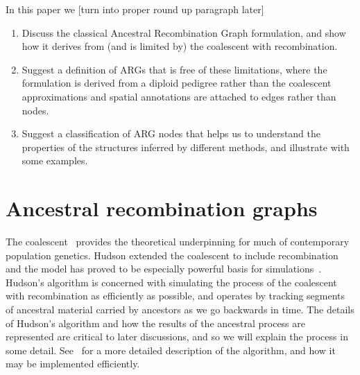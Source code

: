 \documentclass{article}
\begin{document}
In this paper we [turn into proper round up paragraph later]
\begin{enumerate}
\item Discuss the classical Ancestral Recombination Graph formulation,
and show how it derives from (and is limited by) the coalescent with
recombination.
\item Suggest a definition of ARGs that is free of these limitations,
where the formulation is derived from a diploid pedigree rather than
the coalescent approximations and spatial annotations are attached to
edges rather than nodes.
\item Suggest a classification of ARG nodes that helps us to understand
the properties of the structures inferred by different methods, and illustrate
with some examples.
\end{enumerate}

\section*{Ancestral recombination graphs}
The coalescent~\citep{kingman1982coalescent,kingman1982genealogy,
hudson1983testing, tajima1983evolutionary}
provides the theoretical underpinning for much of contemporary population genetics.
Hudson extended the coalescent to include
recombination~\citep{hudson1983properties,hudson1990gene}
and the model has proved to be especially powerful basis for
simulations~\citep{hudson2002generating,kelleher2016efficient,kelleher2020coalescent,
baumdicker2021efficient}.
Hudson's algorithm is concerned with simulating the process of
the coalescent with recombination as efficiently as possible, and operates by
tracking segments of ancestral material carried by ancestors as
we go backwards in time. The details of Hudson's algorithm and how the
results of the ancestral process are represented are critical to later
discussions, and so we will explain the process in some detail.
See~\cite{kelleher2016efficient} for a more detailed
description of the algorithm, and how it may be implemented efficiently.
\end{document}
